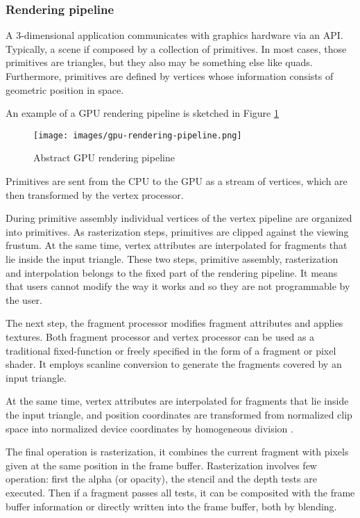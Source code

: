 \documentclass[12pt,a4paper]{extarticle}
\newcommand{\linespace}{\vspace{0pt}}
\begin{document}
\subsubsection{Rendering pipeline} 
A 3-dimensional application communicates with graphics hardware via an API. Typically, a scene if composed by a collection of primitives. In most cases, those primitives are triangles, but they also may be something else like quads.
Furthermore, primitives are defined by vertices whose information consists of geometric position in space.

An example of a GPU rendering pipeline is sketched in Figure \ref{fig:renderingpipeline} 

\begin{figure}[hbtp]

\centering
\texttt{[image: images/gpu-rendering-pipeline.png]}
\caption{Abstract GPU rendering pipeline \cite{weiskopf_2006:1}}
\label{fig:renderingpipeline}
\end{figure}

Primitives are sent from the CPU to the GPU as a stream of vertices, which are then transformed by the vertex processor.

During primitive assembly individual vertices of the vertex pipeline are organized into primitives. As rasterization steps, primitives are clipped against the viewing frustum. At the same time, vertex attributes are interpolated for fragments that lie inside the input triangle. These two steps, primitive assembly, rasterization and interpolation belongs to the fixed part of the rendering pipeline. It means that users cannot modify the way it works and so they are not programmable by the user.

The next step, the fragment processor modifies fragment attributes and applies textures.
Both fragment processor and vertex processor can be used as a traditional fixed-function or freely specified in the form of a fragment or pixel shader. It employs scanline conversion to generate the fragments covered by an input triangle.


At the same time, vertex attributes are interpolated for fragments that lie inside the input triangle, and position coordinates are transformed from normalized clip space into normalized device coordinates by homogeneous division \cite{weiskopf_2006:1}.
\linespace

The final operation is rasterization, it combines the current fragment with pixels given at the same position in the frame buffer. Rasterization involves few operation: first the alpha (or opacity), the stencil and the depth tests are executed. Then if a fragment passes all tests, it can be composited with the frame buffer information or directly written into the frame buffer, both by blending.
\end{document}

